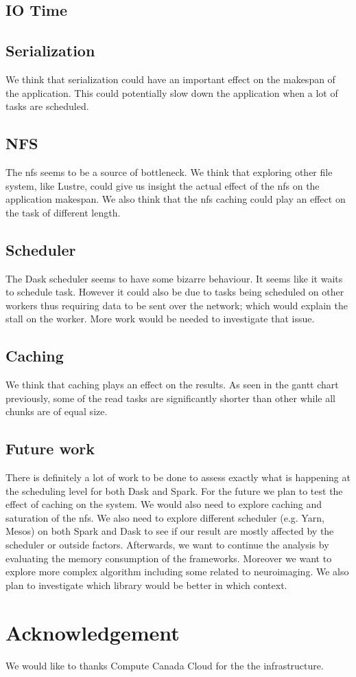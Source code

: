 \documentclass[11pt,a4paper]{article}
\begin{document}
\subsection{IO Time}


\subsection{Serialization}
We think that serialization could have an important effect on the makespan of the
application. This could potentially slow down the application when a lot of tasks are
scheduled.

\subsection{NFS}
The nfs seems to be a source of bottleneck. We think that exploring other file
system, like Lustre, could give us insight the actual effect of the nfs on the
application makespan. We also think that the nfs caching could play an effect on the
task of different length.

\subsection{Scheduler}
The Dask scheduler seems to have some bizarre behaviour. It seems like it waits to
schedule task. However it could also be due to tasks being scheduled on other workers
thus requiring data to be sent over the network; which would explain the stall on the
worker. More work would be needed to investigate that issue.


\subsection{Caching}
We think that caching plays an effect on the results. As seen in the gantt chart
previously, some of the read tasks are significantly shorter than other while all
chunks are of equal size.



\subsection{Future work}
There is definitely a lot of work to be done to assess exactly what is happening at
the scheduling level for both Dask and Spark. For the future we plan to test the
effect of caching on the system. We would also need to explore caching and saturation
of the nfs. We also need to explore different scheduler (e.g. Yarn, Mesos) on both
Spark and Dask to see if our result are mostly affected by the scheduler or outside
factors. Afterwards, we want to continue the analysis by evaluating the memory
consumption of the frameworks. Moreover we want to explore more complex algorithm
including some related to neuroimaging. We also plan to investigate which library
would be better in which context.

\section{Acknowledgement}
We would like to thanks Compute Canada Cloud for the the infrastructure.



\end{document}
